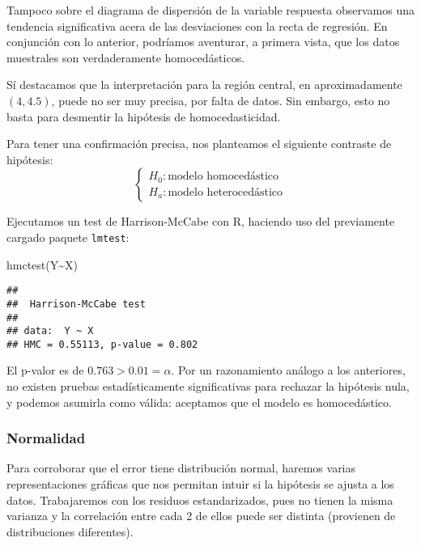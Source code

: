 \documentclass[
]{article}
\newenvironment{Shaded}{\begin{snugshade}}{\end{snugshade}}
\newcommand{\FunctionTok}[1]{\textcolor[rgb]{0.00,0.00,0.00}{#1}}
\newcommand{\NormalTok}[1]{#1}
\newcommand{\SpecialCharTok}[1]{\textcolor[rgb]{0.00,0.00,0.00}{#1}}
\begin{document}
Tampoco sobre el diagrama de dispersión de la variable respuesta
observamos una tendencia significativa acera de las desviaciones con la
recta de regresión. En conjunción con lo anterior, podríamos aventurar,
a primera vista, que los datos muestrales son verdaderamente
homocedásticos.

Sí destacamos que la interpretación para la región central, en
aproximadamente \((4, 4.5)\), puede no ser muy precisa, por falta de
datos. Sin embargo, esto no basta para desmentir la hipótesis de
homocedasticidad.

Para tener una confirmación precisa, nos planteamos el siguiente
contraste de hipótesis: \[
\begin{cases}
H_0: \text{modelo homocedástico}\\
H_a: \text{modelo heterocedástico}
\end{cases}
\]

Ejecutamos un test de Harrison-McCabe con R, haciendo uso del
previamente cargado paquete \texttt{lmtest}:

\begin{Shaded}
\begin{Highlighting}[]
\FunctionTok{hmctest}\NormalTok{(Y}\SpecialCharTok{\textasciitilde{}}\NormalTok{X)}
\end{Highlighting}
\end{Shaded}

\begin{verbatim}
## 
##  Harrison-McCabe test
## 
## data:  Y ~ X
## HMC = 0.55113, p-value = 0.802
\end{verbatim}

El p-valor es de \(0.763 > 0.01 = \alpha\). Por un razonamiento análogo
a los anteriores, no existen pruebas estadísticamente significativas
para rechazar la hipótesis nula, y podemos asumirla como válida:
aceptamos que el modelo es homocedástico.

\hypertarget{normalidad}{%
\subsubsection{Normalidad}\label{normalidad}}

Para corroborar que el error tiene distribución normal, haremos varias
representaciones gráficas que nos permitan intuir si la hipótesis se
ajusta a los datos. Trabajaremos con los residuos estandarizados, pues
no tienen la misma varianza y la correlación entre cada 2 de ellos puede
ser distinta (provienen de distribuciones diferentes).
\end{document}
